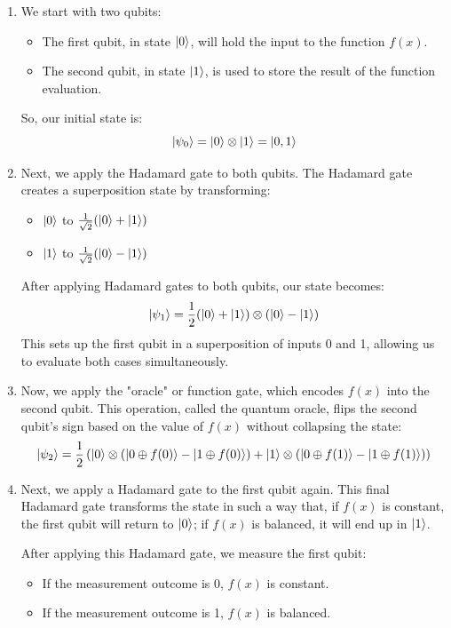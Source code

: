 \documentclass{article}
\begin{document}
		\begin{enumerate}
			\item We start with two qubits:
			\begin{itemize}
				\item The first qubit, in state \( \ket{0} \), will hold the input to the function \( f(x) \).
				\item The second qubit, in state \( \ket{1} \), is used to store the result of the function evaluation.
			\end{itemize}
			
			So, our initial state is:
			\[
			\ket{\psi_0} = \ket{0} \otimes \ket{1} = \ket{0,1}
			\]
		
			\item Next, we apply the Hadamard gate to both qubits. The Hadamard gate creates a superposition state by transforming:
			\begin{itemize}
				\item \( \ket{0} \) to \( \frac{1}{\sqrt{2}} (\ket{0} + \ket{1}) \)
				\item \( \ket{1} \) to \( \frac{1}{\sqrt{2}} (\ket{0} - \ket{1}) \)
			\end{itemize}
			
			After applying Hadamard gates to both qubits, our state becomes:
			\[
			\ket{\psi_1} = \frac{1}{2} (\ket{0} + \ket{1}) \otimes (\ket{0} - \ket{1})
			\]
			This sets up the first qubit in a superposition of inputs 0 and 1, allowing us to evaluate both cases simultaneously.
		
			\item Now, we apply the "oracle" or function gate, which encodes \( f(x) \) into the second qubit. This operation, called the quantum oracle, flips the second qubit’s sign based on the value of \( f(x) \) without collapsing the state:
			\[
			\ket{\psi_2} = \frac{1}{2} \left( \ket{0} \otimes (\ket{0 \oplus f(0)} - \ket{1 \oplus f(0)}) + \ket{1} \otimes (\ket{0 \oplus f(1)} - \ket{1 \oplus f(1)}) \right)
			\]
		
			\item Next, we apply a Hadamard gate to the first qubit again. This final Hadamard gate transforms the state in such a way that, if \( f(x) \) is constant, the first qubit will return to \( \ket{0} \); if \( f(x) \) is balanced, it will end up in \( \ket{1} \).
		
			After applying this Hadamard gate, we measure the first qubit:
			\begin{itemize}
				\item If the measurement outcome is 0, \( f(x) \) is constant.
				\item If the measurement outcome is 1, \( f(x) \) is balanced.
			\end{itemize}
		\end{enumerate}
		
\end{document}
